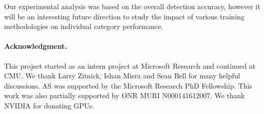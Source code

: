 \documentclass[10pt,twocolumn,letterpaper]{article}
\begin{document}
Our experimental analysis was based on the overall detection accuracy, however it will be an interesting future direction to study the impact of various training methodologies on individual category performance.


\vspace{-0.1in}
\paragraph{Acknowledgment.}
This project started as an intern project at Microsoft Research and continued at CMU. We thank Larry Zitnick, Ishan Misra and Sean Bell for many helpful discussions. AS was supported by the Microsoft Research PhD Fellowship. This work was also partially supported by ONR MURI N000141612007. We thank NVIDIA for donating GPUs.




\end{document}
